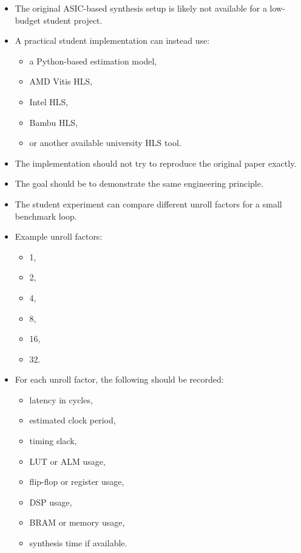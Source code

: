 \documentclass[conference]{IEEEtran}
\begin{document}
\begin{itemize}
    \item The original ASIC-based synthesis setup is likely not available for a low-budget student project.
    \item A practical student implementation can instead use:
    \begin{itemize}
        \item a Python-based estimation model,
        \item AMD Vitis HLS,
        \item Intel HLS,
        \item Bambu HLS,
        \item or another available university HLS tool.
    \end{itemize}

    \item The implementation should not try to reproduce the original paper exactly.
    \item The goal should be to demonstrate the same engineering principle.
    \item The student experiment can compare different unroll factors for a small benchmark loop.
    \item Example unroll factors:
    \begin{itemize}
        \item 1,
        \item 2,
        \item 4,
        \item 8,
        \item 16,
        \item 32.
    \end{itemize}

    \item For each unroll factor, the following should be recorded:
    \begin{itemize}
        \item latency in cycles,
        \item estimated clock period,
        \item timing slack,
        \item LUT or ALM usage,
        \item flip-flop or register usage,
        \item DSP usage,
        \item BRAM or memory usage,
        \item synthesis time if available.
    \end{itemize}
\end{itemize}
\end{document}
